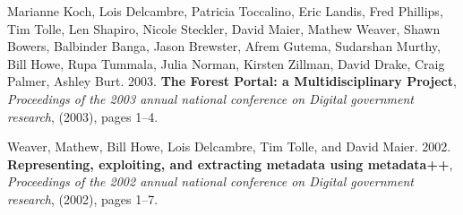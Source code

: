 \begin{bulletlist}
\item Marianne Koch, Lois Delcambre,
Patricia Toccalino, Eric Landis, Fred Phillips, Tim Tolle,
Len Shapiro, Nicole Steckler, David Maier, Mathew Weaver,
Shawn Bowers, Balbinder Banga,
Jason Brewster, Afrem Gutema, Sudarshan Murthy, Bill Howe, Rupa Tummala,
Julia Norman, Kirsten Zillman,
David Drake, Craig Palmer,
Ashley Burt. 2003. \textbf{The Forest Portal: a Multidisciplinary Project}, 
  \emph{Proceedings of the 2003 annual national conference on Digital government research},
(2003), pages 1--4.

\item Weaver, Mathew, Bill Howe, Lois Delcambre, Tim Tolle, and David Maier. 2002. 
\textbf{Representing, exploiting, and extracting metadata using metadata++},
\emph{Proceedings of the 2002 annual national conference on Digital government research},
(2002), pages 1--7.

\end{bulletlist}


